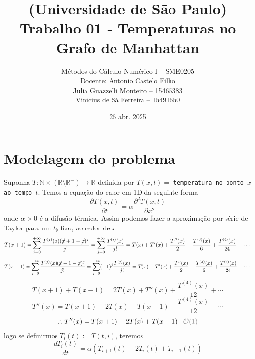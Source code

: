 \documentclass{article}
\title{(Universidade de São Paulo)\\
Trabalho 01 - Temperaturas no Grafo de Manhattan}
\author{Métodos do Cálculo Numérico I -- SME0205\\
Docente: Antonio Castelo Filho\\[.2cm]
Julia Guazzelli Monteiro -- 15465383\\
Vinícius de Sá Ferreira -- 15491650}
\date{26 abr. 2025}
\begin{document}
    \maketitle
    
    \section{Modelagem do problema}

    Suponha $T: \mathbb{N} \times (\mathbb{R} \setminus \mathbb{R}^-) \to \mathbb{R}$ definida por $T(x,t) =$ \verb|temperatura no ponto |$x$\verb| ao tempo |$t$. Temos a equação do calor em 1D da seguinte forma
    \[\frac{\partial T(x,t)}{\partial t} = \alpha \frac{\partial^2 T(x,t)}{\partial x^2}\]
    onde $\alpha > 0$ é a difusão térmica. Assim podemos fazer a aproximação por série de Taylor para um $t_0$ fixo, ao redor de $x$
    \[T(x+1) = \sum_{j=0}^{+\infty} \frac{T^{(j)}(x) (\cancel{x}+1-\cancel{x})^j}{j!} = \sum_{j=0}^{+\infty} \frac{T^{(j)}(x)}{j!} = T(x) + T'(x) + \frac{T''(x)}{2} + \frac{T^{(3)}(x)}{6} + \frac{T^{(4)}(x)}{24} + \cdots\]
    \[T(x-1) = \sum_{j=0}^{+\infty} \frac{T^{(j)}(x) (\cancel{x}-1-\cancel{x})^j}{j!} = \sum_{j=0}^{+\infty} (-1)^j\frac{T^{(j)}(x)}{j!} = T(x) - T'(x) + \frac{T''(x)}{2} - \frac{T^{(3)}(x)}{6} + \frac{T^{(4)}(x)}{24} - \cdots\]
    \[T(x+1)+T(x-1) = 2T(x) + T''(x) + \frac{T^{(4)}(x)}{12} + \cdots\]
    \[ T''(x) = T(x+1)-2T(x)+T(x-1) - \frac{T^{(4)}(x)}{12} - \cdots\]
    \[\therefore T''(x) = T(x+1)-2T(x)+T(x-1) \color{gray}{- \mathcal{O}(1)}\]
    logo se definirmos $T_i(t) := T(t,i)$, teremos
    \[\frac{dT_i(t)}{dt} = \alpha (T_{i+1}(t)-2T_i(t)+T_{i-1}(t))\]
\end{document}
